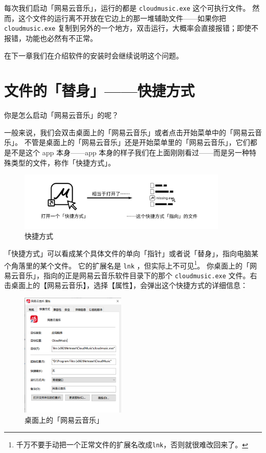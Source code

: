 每次我们启动「网易云音乐」，运行的都是 \verb|cloudmusic.exe| 这个可执行文件。
然而，这个文件的运行离不开放在它边上的那一堆辅助文件——如果你把 \verb|cloudmusic.exe| 复制到另外的一个地方，双击运行，大概率会直接报错；即使不报错，功能也必然有不正常。

在下一章我们在介绍软件的安装时会继续说明这个问题。

\section{文件的「替身」——快捷方式}

你是怎么启动「网易云音乐」的呢？

一般来说，我们会双击桌面上的「网易云音乐」或者点击开始菜单中的「网易云音乐」。
不管是桌面上的「网易云音乐」还是开始菜单里的「网易云音乐」，它们都是不是这个 app 本身——app 本身的样子我们在上面刚刚看过——而是另一种特殊类型的文件，称作「快捷方式」。

\begin{figure}[htb!]
  \centering
  \includegraphics[width=10cm]{assets/Shortcut.png}
  \caption{快捷方式}
  \label{Shortcut}
\end{figure}

「快捷方式」可以看成某个具体文件的单向「指针」或者说「替身」，指向电脑某个角落里的某个文件。
它的扩展名是 \verb|lnk| ，但实际上不可见\footnote{千万不要手动把一个正常文件的扩展名改成\texttt{lnk}，否则就很难改回来了。}。
你桌面上的「网易云音乐」，指向的正是网易云音乐软件目录下的那个 \verb|cloudmusic.exe| 文件。右击桌面上的【网易云音乐】，选择【属性】，会弹出这个快捷方式的详细信息：

\begin{figure}
  \centering
  \includegraphics[width=5cm]{assets/NetEase_Music_Link.png}
  \caption{桌面上的「网易云音乐」}
  \label{NetEase_Music_Link}
\end{figure}

